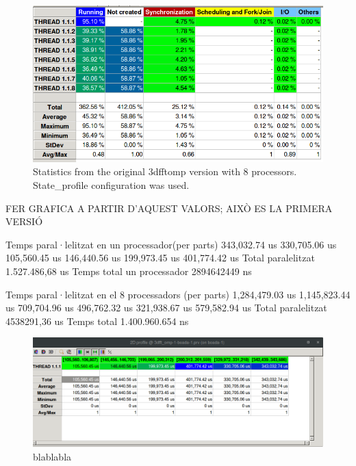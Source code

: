 \documentclass[12]{article}
\begin{document}
\begin{figure}[H]
\centering  \includegraphics[width=\linewidth]{images/3dfftomp_original_8.png}
  \caption{Statistics from the original 3dfftomp version with 8 processors. State\_profile configuration was used.}
  \label{fig:3dfftomp_original_8}
\end{figure}

FER GRAFICA A PARTIR D'AQUEST VALORS; AIXÒ ES LA PRIMERA VERSIÓ 

Temps paral·lelitzat en un processador(per parts)
343,032.74 us
330,705.06 us
105,560.45 us
146,440.56 us
199,973.45 us
401,774.42 us
Total paralelitzat
1.527.486,68 us
Temps total un processador
2894642449 ns

 
Temps paral·lelitzat en el 8 processadors (per parts)
1,284,479.03 us
1,145,823.44 us
709,704.96 us
496,762.32 us
321,938.67 us
579,582.94 us
Total paralelitzat
4538291,36 us
Temps total 
1.400.960.654 ns 




\begin{figure}[H]
\centering  \includegraphics[width=\linewidth]{images/TempsParalVersio1Processador1.png}
  \caption{blablabla}
  \label{fig:tempsParalv1Proc1}
\end{figure}
\end{document}
